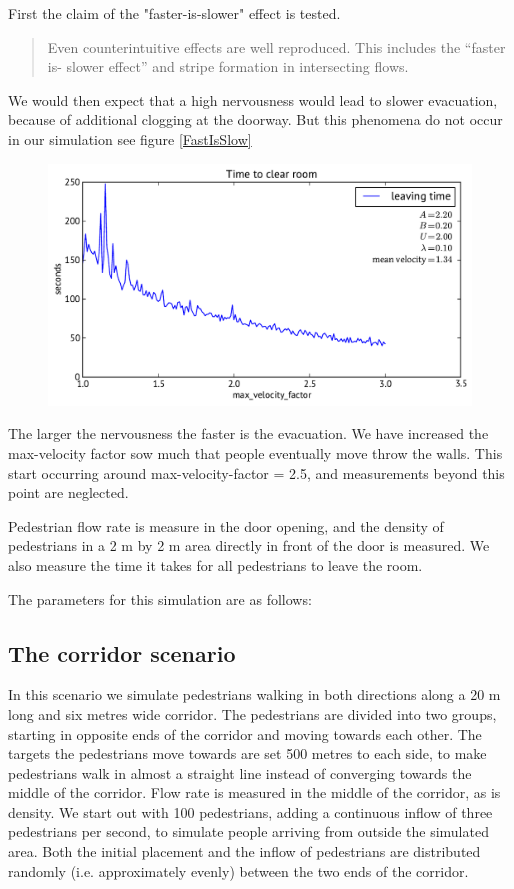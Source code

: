 First the claim of the "faster-is-slower" effect is tested.
\begin{quote}
Even counterintuitive
effects are well reproduced. This includes the “faster is-
slower effect” and stripe formation in intersecting flows. \cite{self-org}
\end{quote}
We would then expect that a high nervousness would lead to slower evacuation, because of additional clogging at the doorway. But this phenomena do not occur in our simulation see figure \ref{FastIsSlow}
\begin{figure}
\centering
\includegraphics[scale=0.5]{figures/fastIsSlowNot}
\end{figure}
The larger the nervousness the faster is the evacuation. We have increased the max-velocity factor sow much that people eventually move throw the walls. This start occurring around max-velocity-factor = 2.5, and measurements beyond this point are neglected.

Pedestrian flow rate is measure in the door opening, and the density of pedestrians in a 2 m by 2 m area directly in front of the door is measured. We also measure the time it takes for all pedestrians to leave the room.

The parameters for this simulation are as follows:



\subsection{The corridor scenario}
In this scenario we simulate pedestrians walking in both directions along a 20 
m long and six metres wide corridor. The pedestrians are divided into two 
groups, starting in opposite ends of the corridor and moving towards each 
other. The targets the pedestrians move towards are set 500 metres to each 
side, to make pedestrians walk in almost a straight line instead of converging 
towards the middle of the corridor. Flow rate is measured in the middle of the 
corridor, as is density. We start out with 100 pedestrians, adding a 
continuous inflow of three pedestrians per second, to simulate people arriving 
from outside the simulated area. Both the initial placement and the inflow of 
pedestrians are distributed randomly (i.e. approximately evenly) between the 
two ends of the corridor.

